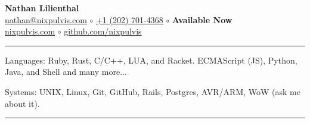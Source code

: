 \documentclass[10pt,letterpaper]{article}
\newenvironment{indentsection}[1]
{\begin{list}{}
  {\setlength{\leftmargin}{#1}} \item[]
}
{\end{list}}
\begin{document}
\begin{center}
  \huge \textbf{Nathan Lilienthal} \\
  \large
  \href{mailto:nathan@nixpulvis.com}{nathan@nixpulvis.com}
  $\circ$
  \href{tel:12027014368}{+1 (202) 701-4368}
  $\circ$
  {\bf Available Now}
  \\
  \url{nixpulvis.com}
  $\circ$
  \url{github.com/nixpulvis}
  \vspace{-0.2em}
\end{center}


\hrule
\begin{indentsection}{\parindent}
\begin{description*}
  \item[Languages:] Ruby, Rust, C/C++, LUA, and Racket. ECMAScript (JS),
    Python, Java, and Shell and many more...
  \item[Systems:] UNIX, Linux, Git, GitHub, Rails, Postgres, AVR/ARM, WoW
    (ask me about it).
\end{description*}
\end{indentsection}


\hrule
\vspace{-0.4em}
\end{document}
